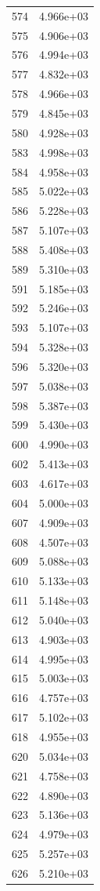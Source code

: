 \documentclass[12pt]{article}
\begin{document}
\begin{longtable}{@{}cc@{}}
574 & 4.966e+03 \\
575 & 4.906e+03 \\
576 & 4.994e+03 \\
577 & 4.832e+03 \\
578 & 4.966e+03 \\
579 & 4.845e+03 \\
580 & 4.928e+03 \\
583 & 4.998e+03 \\
584 & 4.958e+03 \\
585 & 5.022e+03 \\
586 & 5.228e+03 \\
587 & 5.107e+03 \\
588 & 5.408e+03 \\
589 & 5.310e+03 \\
591 & 5.185e+03 \\
592 & 5.246e+03 \\
593 & 5.107e+03 \\
594 & 5.328e+03 \\
596 & 5.320e+03 \\
597 & 5.038e+03 \\
598 & 5.387e+03 \\
599 & 5.430e+03 \\
600 & 4.990e+03 \\
602 & 5.413e+03 \\
603 & 4.617e+03 \\
604 & 5.000e+03 \\
607 & 4.909e+03 \\
608 & 4.507e+03 \\
609 & 5.088e+03 \\
610 & 5.133e+03 \\
611 & 5.148e+03 \\
612 & 5.040e+03 \\
613 & 4.903e+03 \\
614 & 4.995e+03 \\
615 & 5.003e+03 \\
616 & 4.757e+03 \\
617 & 5.102e+03 \\
618 & 4.955e+03 \\
620 & 5.034e+03 \\
621 & 4.758e+03 \\
622 & 4.890e+03 \\
623 & 5.136e+03 \\
624 & 4.979e+03 \\
625 & 5.257e+03 \\
626 & 5.210e+03 \\

\end{longtable}
\end{document}
